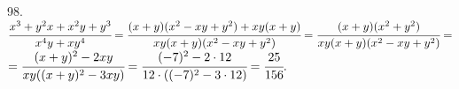 98. $\cfrac{x^3+y^2x+x^2y+y^3}{x^4y+xy^4}=\cfrac{(x+y)(x^2-xy+y^2)+xy(x+y)}{xy(x+y)(x^2-xy+y^2)}=
\cfrac{(x+y)(x^2+y^2)}{xy(x+y)(x^2-xy+y^2)}=$\\$=\cfrac{(x+y)^2-2xy}{xy((x+y)^2-3xy)}=\cfrac{(-7)^2-2\cdot12}{12\cdot((-7)^2-3\cdot12)}=\cfrac{25}{156}.$\\
